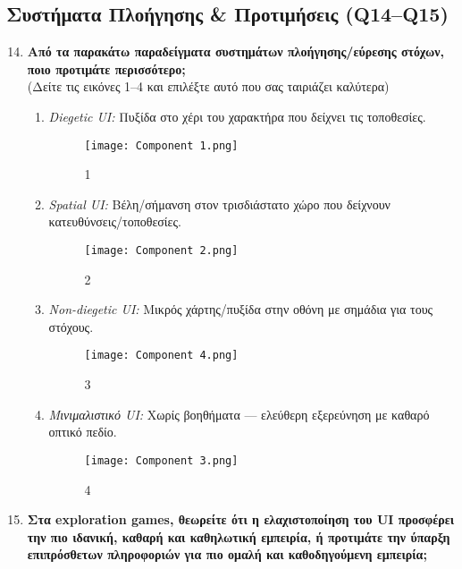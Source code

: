 \subsection*{Συστήματα Πλοήγησης \& Προτιμήσεις (Q14–Q15)}
\begin{enumerate}\setcounter{enumi}{13}
  \item \textbf{Από τα παρακάτω παραδείγματα συστημάτων πλοήγησης/εύρεσης στόχων, ποιο προτιμάτε περισσότερο;}\\
  (Δείτε τις εικόνες 1–4 και επιλέξτε αυτό που σας ταιριάζει καλύτερα)
  \begin{enumerate}
    \item \textit{Diegetic UI:} Πυξίδα στο χέρι του χαρακτήρα που δείχνει τις τοποθεσίες.
\begin{figure}[H]
    \centering
    \texttt{[image: Component 1.png]}
    \caption{1}
    \label{fig:placeholder}
\end{figure}

    \item \textit{Spatial UI:} Βέλη/σήμανση στον τρισδιάστατο χώρο που δείχνουν κατευθύνσεις/τοποθεσίες.
\begin{figure}[H]
    \centering
    \texttt{[image: Component 2.png]}
    \caption{ 2}
    \label{fig:placeholder}
\end{figure}
    \item \textit{Non-diegetic UI:} Μικρός χάρτης/πυξίδα στην οθόνη με σημάδια για τους στόχους.
\begin{figure}[H]
    \centering
    \texttt{[image: Component 4.png]}
    \caption{3}
    \label{fig:placeholder}
\end{figure}
    \item \textit{Μινιμαλιστικό UI:} Χωρίς βοηθήματα — ελεύθερη εξερεύνηση με καθαρό οπτικό πεδίο.
\begin{figure}
    \centering
    \texttt{[image: Component 3.png]}
    \caption{4}
    \label{fig:placeholder}
\end{figure}

  \end{enumerate}
  \item \textbf{Στα exploration games, θεωρείτε ότι η ελαχιστοποίηση του UI προσφέρει την πιο ιδανική, καθαρή και καθηλωτική εμπειρία, ή προτιμάτε την ύπαρξη επιπρόσθετων πληροφοριών για πιο ομαλή και καθοδηγούμενη εμπειρία;}
\end{enumerate}

